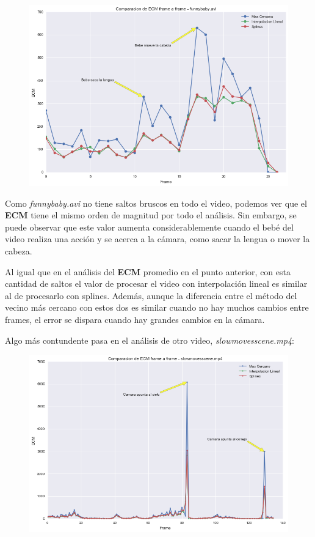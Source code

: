 \begin{figure}[H]
\centering
\includegraphics[width=.95\textwidth]{graficos/ecm_frame_funnybaby.png}
\end{figure}

Como \textit{funnybaby.avi} no tiene saltos bruscos en
todo el video, podemos ver que el \textbf{ECM} tiene el mismo orden de
magnitud por todo el an\'alisis. Sin embargo, se puede observar que este valor
aumenta considerablemente cuando el beb\'e del video realiza una acci\'on y se acerca a
la c\'amara, como sacar la lengua o mover la cabeza.

Al igual que en el an\'alisis del \textbf{ECM} promedio en el punto anterior,
con esta cantidad de saltos el valor de procesar el video con interpolaci\'on
lineal es similar al de procesarlo con splines. Adem\'as, aunque la diferencia
entre el m\'etodo del vecino m\'as cercano con estos dos es similar cuando no hay
muchos cambios entre frames, el error se dispara cuando hay grandes cambios en
la c\'amara.

Algo m\'as contundente pasa en el an\'alisis de otro video,
\textit{slowmovesscene.mp4}:

\begin{figure}[H]
\centering
\includegraphics[width=.95\textwidth]{graficos/ecm_frame_slowmovescene.png}
\end{figure}

